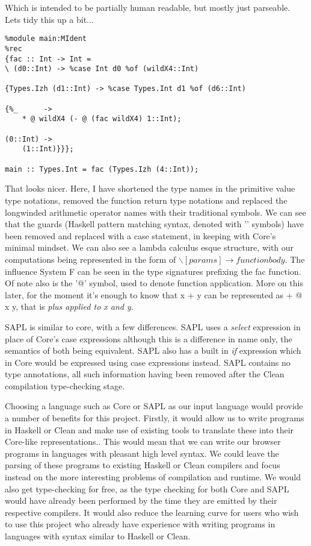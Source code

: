 \documentclass[11pt]{article}
\begin{document}
\noindent Which is intended to be partially human readable, but mostly
just parseable. Lets tidy this up a bit...

\begin{verbatim}
%module main:MIdent
%rec
{fac :: Int -> Int =
\ (d0::Int) -> %case Int d0 %of (wildX4::Int)

{Types.Izh (d1::Int) -> %case Types.Int d1 %of (d6::Int)

{%_      ->
    * @ wildX4 (- @ (fac wildX4) 1::Int);

(0::Int) ->
    (1::Int)}}};

main :: Types.Int = fac (Types.Izh (4::Int));
\end{verbatim}

\noindent That looks nicer. Here, I have shortened the type names in the
primitive value type notations, removed the function return type notations
and replaced the longwinded arithmetic operator names with their traditional
symbols. We can see that the guards (Haskell pattern matching syntax, denoted
with '\textbar' symbols) have been removed and replaced with a case statement, in
keeping with Core's minimal mindset. We can also see a lambda calculus esque
structure, with our computations being represented in the form of \( \backslash
 [params] \rightarrow function body\). The influence System F can be seen in
 the type signatures prefixing the fac function. Of note also is the '@' symbol, used
 to denote function application. More on this later, for the moment it's enough
 to know that x + y can be represented as + @ x y, that is \emph{plus applied to
 x and y}.
 
SAPL is similar to core, with a few differences. SAPL uses a \emph{select} 
expression in place of Core's case expressions although this is a difference in name
only, the semantics of both being equivalent. SAPL also has a built in \emph{if}
expression which in Core would be expressed using case expressions instead. SAPL
contains no type annotations, all such information having been removed after the
Clean compilation type-checking stage.

Choosing a language such as Core or SAPL as our input language would provide
a number of benefits for this project. Firstly, it would allow us to write
programs in Haskell or Clean and make use of existing tools to translate these
into their Core-like representations.. This would mean that we can write our browser
programs in languages with pleasant high level syntax. We could leave the 
parsing of these programs to existing Haskell or Clean compilers and focus 
instead on the more interesting problems of compilation and runtime. We would
also get type-checking for free, as the type checking for both Core and SAPL 
would have already been performed by the time they are emitted by their respective
compilers. It would also reduce the learning curve for users who wish to use
this project who already have experience with writing programs in languages
with syntax similar to Haskell or Clean.
 
\end{document}
